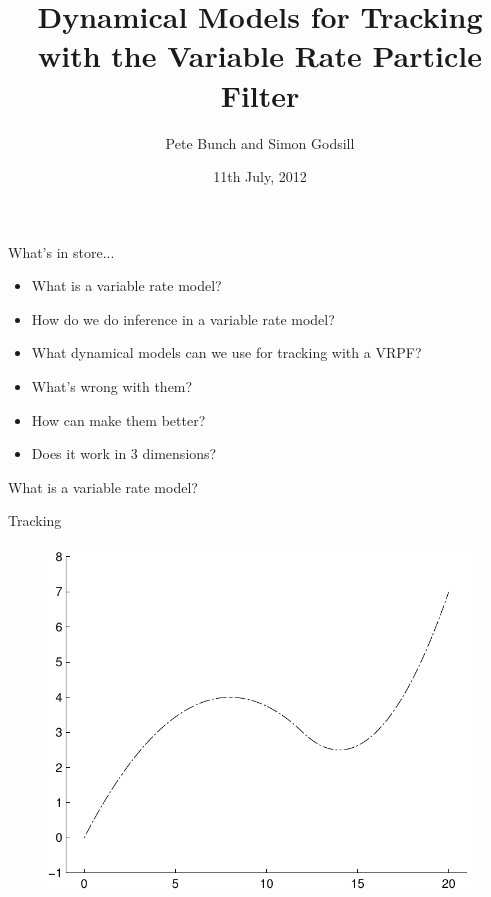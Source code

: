 \documentclass{beamer}
\title[Variable Rate Tracking]{Dynamical Models for Tracking with the Variable Rate Particle Filter}
\author[P. Bunch \& S. Godsill]{Pete Bunch and Simon Godsill}
\institute[CUED SigProC]{Cambridge University Engineering Department\\ Signal Processing \& Communications Lab}
\date{11th July, 2012}
\begin{document}
\begin{frame}
\titlepage
\end{frame}

\begin{frame}{What's in store...}
\begin{itemize}
  \item What is a variable rate model?
  \item How do we do inference in a variable rate model?
  \item What dynamical models can we use for tracking with a VRPF?
  \item What's wrong with them?
  \item How can make them better?
  \item Does it work in 3 dimensions?
\end{itemize}
\end{frame}

\begin{frame}
What is a variable rate model?
\end{frame}

\begin{frame}{Tracking}
\begin{figure}\centering\includegraphics[scale=0.5]{track.pdf}\end{figure}
\end{frame}
\end{document}
